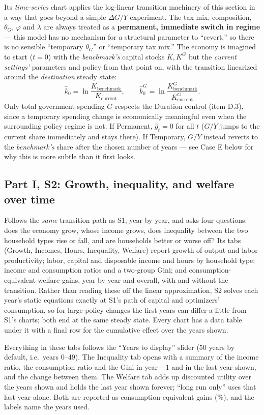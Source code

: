\documentclass[11pt]{article}
\newcommand{\eq}[1]{\begin{equation}#1\end{equation}}
\begin{document}
Its \emph{time-series} chart applies the log-linear transition machinery
of this section in a way that goes beyond a simple $\Delta G/Y$
experiment. The tax mix, composition, $\theta_G$, $\varphi$ and $\lambda$
are always treated as a \textbf{permanent, immediate switch in regime} ---
this model has no mechanism for a structural parameter to ``revert,'' so
there is no sensible ``temporary $\theta_G$'' or ``temporary tax mix.'' The
economy is imagined to start ($t=0$) with the \emph{benchmark's} capital
stocks $K,K^G$ but the \emph{current settings'} parameters and policy from
that point on, with the transition linearized around the
\emph{destination} steady state:
\eq{ \hat k_0 = \ln\!\frac{K_{\text{benchmark}}}{K_{\text{current}}}, \qquad \hat{k}^G_0 = \ln\!\frac{K^G_{\text{benchmark}}}{K^G_{\text{current}}}. }
Only total government spending $G$ respects the Duration control (item
D.3), since a temporary spending change is economically meaningful even
when the surrounding policy regime is not. If Permanent, $\hat g_t=0$ for
all $t$ ($G/Y$ jumps to the current share immediately and stays there). If
Temporary, $G/Y$ instead reverts to the \emph{benchmark's} share after the
chosen number of years --- see Case E below for why this is more subtle
than it first looks.

\subsection{Part I, S2: Growth, inequality, and welfare over time}

Follows the \emph{same} transition path as S1, year by year, and asks four
questions: does the economy grow, whose income grows, does inequality
between the two household types rise or fall, and are households better
or worse off? Its tabs (Growth, Incomes, Hours, Inequality, Welfare) report
growth of output and labor productivity; labor, capital and disposable
income and hours by household type; income and consumption ratios and a
two-group Gini; and consumption-equivalent welfare gains, year by year
and overall, with and without the transition. Rather than reading these off the
linear approximation, S2 solves each year's static equations exactly at
S1's path of capital and optimizers' consumption, so for large policy
changes the first years can differ a little from S1's charts; both end at
the same steady state. Every chart has a data table under it with a final
row for the cumulative effect over the years shown.

Everything in these tabs follows the ``Years to display'' slider (50 years
by default, i.e.\ years 0--49). The Inequality tab opens with a summary of
the income ratio, the consumption ratio and the Gini in year $-1$ and in
the last year shown, and the change between them. The Welfare tab adds up
discounted utility over the years shown and holds the last year shown
forever; ``long run only'' uses that last year alone. Both are reported as
consumption-equivalent gains (\%), and the labels name the years used.
\end{document}
